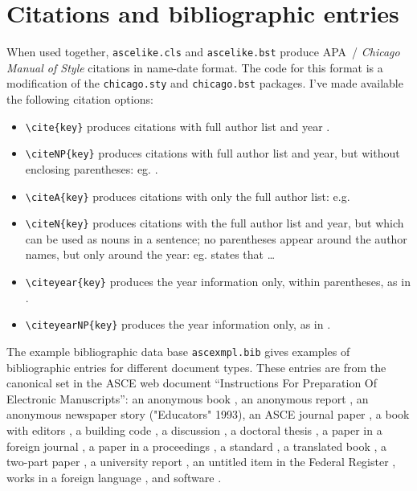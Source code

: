 \documentclass[Proceedings]{ascelike}
\begin{document}
\section{Citations and bibliographic entries}
When used together, \texttt{ascelike.cls} and \texttt{ascelike.bst}
produce APA~/ \emph{Chica\-go Manual of Style} citations in
name-date format.
The code for this format is a modification of the \texttt{chicago.sty} and
\texttt{chicago.bst} packages.
I've made available the following citation options:
\begin{itemize}
\item
\verb+\cite{key}+ produces citations with full author 
list and year \cite{Ireland:1954a}.
\item
\verb+\citeNP{key}+ produces citations with full author list and year, 
but without enclosing parentheses: eg. .
\item
\verb+\citeA{key}+ produces citations with only the full 
author list: e.g. 
\item
\verb+\citeN{key}+ produces citations with the full author list and year, but
which can be used as nouns in a sentence; no parentheses appear around
the author names, but only around the year: eg. 
states that \ldots
\item
\verb+\citeyear{key}+ produces the year information only, within parentheses,
as in \citeyear{Ireland:1954a}.
\item
\verb+\citeyearNP{key}+ produces the year information only,
as in .
\end{itemize}
%
\par
The example bibliographic data base \texttt{ascexmpl.bib}
gives examples of bibliographic entries for different document types.
These entries are from the canonical set in the
ASCE web document ``Instructions For Preparation Of Electronic Manuscripts'':
an anonymous book \cite{Moody:1988a}, 
an anonymous report \cite{FHWA:1991a}, 
an anonymous newspaper story ("Educators" 1993), 
an ASCE journal paper \cite{Pennoni:1992a}, 
a book with editors \cite{Zadeh:1981a}, 
a building code \cite{ICBO:1988a}, 
a discussion \cite{Vesilind:1992a}, 
a doctoral thesis \cite{Chang:1987a}, 
a paper in a foreign journal \cite{Ireland:1954a}, 
a paper in a proceedings \cite{Eshenaur:1991a}, 
a standard \cite{ASTM:1991a}, 
a translated book \cite{Melan:1913a}, 
a two-part paper \cite{Frater:1992a,Frater:1992b}, 
a university report \cite{Duan:1990a}, 
an untitled item in the Federal Register \cite{FR:1968a}, 
works in a foreign language \cite{Duvant:1972a,Reiffenstuhl:1982a},
and software \cite{Lotus:1985a}.  
%
\end{document}
